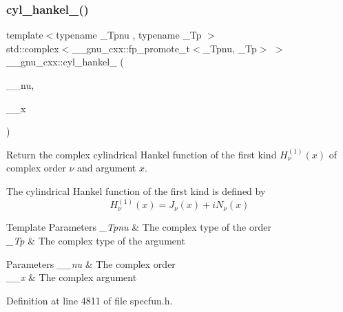\subsubsection{\texorpdfstring{cyl\+\_\+hankel\+\_()}{cyl\_hankel\_1()}\hspace{0.1cm}{\footnotesize\ttfamily [2/2]}}
{\footnotesize\ttfamily template$<$typename \+\_\+\+Tpnu , typename \+\_\+\+Tp $>$ \\
std\+::complex$<$\+\_\+\+\_\+gnu\+\_\+cxx\+::fp\+\_\+promote\+\_\+t$<$\+\_\+\+Tpnu, \+\_\+\+Tp$>$ $>$ \+\_\+\+\_\+gnu\+\_\+cxx\+::cyl\+\_\+hankel\+\_ (\begin{DoxyParamCaption}\item[{std\+::complex$<$ \+\_\+\+Tpnu $>$}]{\+\_\+\+\_\+nu,  }\item[{std\+::complex$<$ \+\_\+\+Tp $>$}]{\+\_\+\+\_\+x }\end{DoxyParamCaption})\hspace{0.3cm}{\ttfamily [inline]}}

Return the complex cylindrical Hankel function of the first kind $ H^{(1)}_\nu(x) $ of complex order $ \nu $ and argument $ x $.

The cylindrical Hankel function of the first kind is defined by \[ H^{(1)}_\nu(x) = J_\nu(x) + i N_\nu(x) \]


\begin{DoxyTemplParams}{Template Parameters}
{\em \+\_\+\+Tpnu} & The complex type of the order \\
\hline
{\em \+\_\+\+Tp} & The complex type of the argument \\
\hline
\end{DoxyTemplParams}

\begin{DoxyParams}{Parameters}
{\em \+\_\+\+\_\+nu} & The complex order \\
\hline
{\em \+\_\+\+\_\+x} & The complex argument \\
\hline
\end{DoxyParams}


Definition at line 4811 of file specfun.\+h.

\mbox{\label{group__gnu__math__spec__func_ga89758ed03e56567baa62b90cc4784f71}} 
